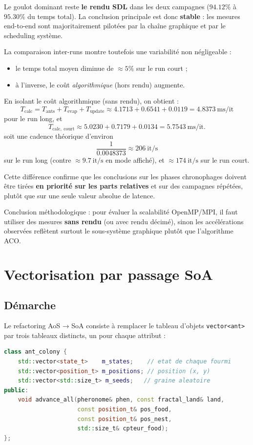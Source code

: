 Le goulot dominant reste \textbf{le rendu SDL} dans les deux campagnes
(\(94.12\%\) à \(95.30\%\) du temps total). La conclusion principale est donc
\textbf{stable} : les mesures end-to-end sont majoritairement pilotées par la
chaîne graphique et par le scheduling système.

La comparaison inter-runs montre toutefois une variabilité non négligeable :
\begin{itemize}
    \item le temps total moyen diminue de \(\approx 5\%\) sur le run court ;
    \item à l'inverse, le coût \emph{algorithmique} (hors rendu) augmente.
\end{itemize}

En isolant le coût algorithmique (sans rendu), on obtient :
\[
T_{\mathrm{calc}} = T_{\mathrm{ants}} + T_{\mathrm{evap}} + T_{\mathrm{update}}
\approx 4.1713 + 0.6541 + 0.0119 = 4.8373\ \mathrm{ms/it}
\]
pour le run long, et
\[
T_{\mathrm{calc,\ court}} \approx 5.0230 + 0.7179 + 0.0134 = 5.7543\ \mathrm{ms/it}.
\]
soit une cadence théorique d'environ
\[
\frac{1}{0.0048373} \approx 206\ \mathrm{it/s}
\]
sur le run long (contre \(\approx 9.7\ \mathrm{it/s}\) en mode affiché), et
\(\approx 174\ \mathrm{it/s}\) sur le run court.

Cette différence confirme que les conclusions sur les phases chronophages doivent
être tirées \textbf{en priorité sur les parts relatives} et sur des campagnes
répétées, plutôt que sur une seule valeur absolue de latence.

Conclusion méthodologique : pour évaluer la scalabilité OpenMP/MPI, il faut
utiliser des mesures \textbf{sans rendu} (ou avec rendu décimé), sinon les
accélérations observées reflètent surtout le sous-système graphique plutôt que
l'algorithme ACO.

\section{Vectorisation par passage SoA}

\subsection{Démarche}

Le refactoring AoS → SoA consiste à remplacer le tableau d'objets \texttt{vector<ant>}
par trois tableaux distincts, un pour chaque attribut :

\begin{lstlisting}[language=C++, caption={Structure SoA dans ant\_colony (ant.hpp)}]
class ant_colony {
    std::vector<state_t>    m_states;    // etat de chaque fourmi
    std::vector<position_t> m_positions; // position (x, y)
    std::vector<std::size_t> m_seeds;   // graine aleatoire
public:
    void advance_all(pheronome& phen, const fractal_land& land,
                     const position_t& pos_food,
                     const position_t& pos_nest,
                     std::size_t& cpteur_food);
};
\end{lstlisting}

